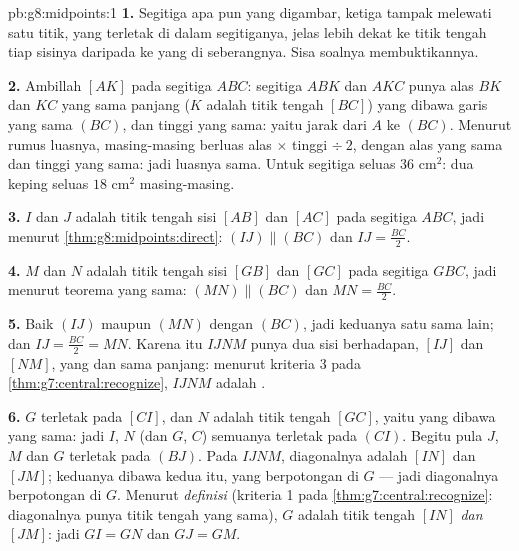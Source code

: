 \begin{solution}{pb:g8:midpoints:1}
\textbf{1.} Segitiga apa pun yang digambar, ketiga 
tampak melewati satu titik, yang terletak di dalam segitiganya, jelas
lebih dekat ke titik tengah tiap sisinya daripada ke  yang
di seberangnya. Sisa soalnya membuktikannya.

\textbf{2.} Ambillah  $[AK]$ pada segitiga $ABC$: segitiga
$ABK$ dan $AKC$ punya alas $BK$ dan $KC$ yang sama panjang
($K$ adalah titik tengah $[BC]$) yang dibawa garis yang sama
$(BC)$, dan tinggi yang sama: yaitu jarak dari $A$ ke $(BC)$.
Menurut rumus luasnya, masing-masing berluas
alas $\times$ tinggi $\div\ 2$, dengan alas yang sama dan tinggi yang
sama: jadi luasnya sama. Untuk segitiga seluas
$36$ cm$^2$: dua keping seluas $18$ cm$^2$ masing-masing.

\textbf{3.} $I$ dan $J$ adalah titik tengah sisi $[AB]$ dan
$[AC]$ pada segitiga $ABC$, jadi menurut
\cref{thm:g8:midpoints:direct}: $(IJ) \parallel (BC)$ dan
$IJ = \frac{BC}{2}$.

\textbf{4.} $M$ dan $N$ adalah titik tengah sisi $[GB]$ dan
$[GC]$ pada segitiga $GBC$, jadi menurut teorema yang sama:
$(MN) \parallel (BC)$ dan $MN = \frac{BC}{2}$.

\textbf{5.} Baik $(IJ)$ maupun $(MN)$  dengan $(BC)$, jadi
keduanya  satu sama lain; dan $IJ = \frac{BC}{2} = MN$. Karena
itu  $IJNM$ punya dua sisi berhadapan, $[IJ]$ dan
$[NM]$, yang  dan sama panjang: menurut kriteria 3 pada
\cref{thm:g7:central:recognize}, $IJNM$ adalah .

\textbf{6.} $G$ terletak pada  $[CI]$, dan $N$ adalah
titik tengah $[GC]$, yaitu  yang dibawa  yang
sama: jadi $I$, $N$ (dan $G$, $C$) semuanya terletak pada $(CI)$.
Begitu pula $J$, $M$ dan $G$ terletak pada  $(BJ)$. Pada
 $IJNM$, diagonalnya adalah $[IN]$ dan $[JM]$; keduanya
dibawa kedua  itu, yang berpotongan di $G$ --- jadi
diagonalnya berpotongan di $G$. Menurut \emph{definisi} 
(kriteria 1 pada \cref{thm:g7:central:recognize}: diagonalnya punya
titik tengah yang sama), $G$ adalah titik tengah $[IN]$ \emph{dan}
$[JM]$: jadi $GI = GN$ dan $GJ = GM$.


\end{solution}
